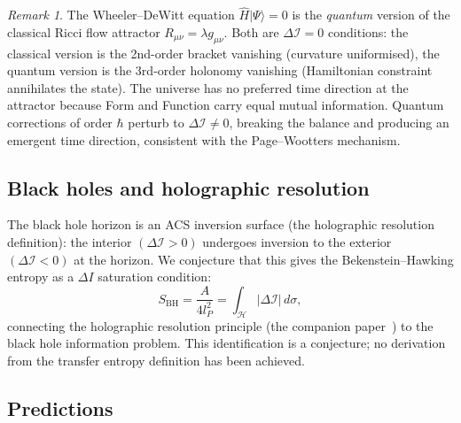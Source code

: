 \documentclass[11pt,a4paper]{article}
\theoremstyle{plain}
\theoremstyle{definition}
\theoremstyle{remark}
\newtheorem{remark}[theorem]{Remark}
\newcommand{\DI}{\Delta\mathcal{I}}
\begin{document}
\begin{remark}
The Wheeler--DeWitt equation $\hat{H}|\Psi\rangle = 0$ is the
\emph{quantum} version of the classical Ricci flow attractor
$R_{\mu\nu} = \lambda g_{\mu\nu}$.  Both are $\DI = 0$ conditions:
the classical version is the 2nd-order bracket vanishing
(curvature uniformised), the quantum version is the 3rd-order
holonomy vanishing (Hamiltonian constraint annihilates the state).
The universe has no preferred time direction at the attractor because
Form and Function carry equal mutual information.
Quantum corrections of order $\hbar$ perturb to $\DI \neq 0$,
breaking the balance and producing an emergent time direction,
consistent with the Page--Wootters mechanism.
\end{remark}

\subsection{Black holes and holographic resolution}

The black hole horizon is an ACS inversion surface (the holographic resolution definition):
the interior $(\DI > 0)$ undergoes inversion to the exterior $(\DI < 0)$ at the horizon.
We conjecture that this gives the Bekenstein--Hawking entropy as a $\Delta I$ saturation condition:
\[
  S_{\text{BH}} = \frac{A}{4l_P^2} = \int_\mathcal{H} |\DI| \,d\sigma,
\]
connecting the holographic resolution principle (the companion paper~\cite{Wallace2026c})
to the black hole information problem.  This identification is a conjecture;
no derivation from the transfer entropy definition has been achieved.

\subsection{Predictions}
\end{document}
